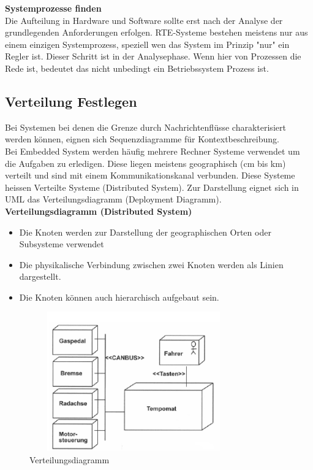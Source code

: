 \textbf{Systemprozesse finden}\\
Die Aufteilung in Hardware und Software sollte erst nach der Analyse der grundlegenden Anforderungen erfolgen.
RTE-Systeme bestehen meistens nur aus einem einzigen Systemprozess, speziell wen das System im Prinzip "nur" ein
Regler ist. Dieser Schritt ist in der Analysephase. Wenn hier von Prozessen die Rede ist, bedeutet das nicht unbedingt ein
Betriebssystem Prozess ist.\newline

\subsection{Verteilung Festlegen }
Bei Systemen bei denen die Grenze durch Nachrichtenflüsse charakterisiert werden können, eignen sich Sequenzdiagramme
für Kontextbeschreibung.\\

Bei Embedded System werden häufig mehrere Rechner Systeme verwendet um die Aufgaben zu erledigen. Diese liegen meistens 
geographisch (cm bis km) verteilt und sind mit einem Kommunikationskanal verbunden. Diese Systeme heissen Verteilte Systeme 
(Distributed System). Zur Darstellung eignet sich in UML das Verteilungsdiagramm (Deployment Diagramm).\\

\textbf{Verteilungsdiagramm (Distributed System)}
\begin{itemize}
	\item Die Knoten werden zur Darstellung der geographischen Orten oder Subsysteme verwendet
	\item Die physikalische Verbindung zwischen zwei Knoten werden als Linien dargestellt.
	\item Die Knoten können auch hierarchisch aufgebaut sein.
\end{itemize}

\begin{figure}[h]
	\centering
	\includegraphics[height=6cm, width = 9cm,]{images/Modellierung/Verteilungsdiagramm}
	\caption{Verteilungsdiagramm}
\end{figure}

